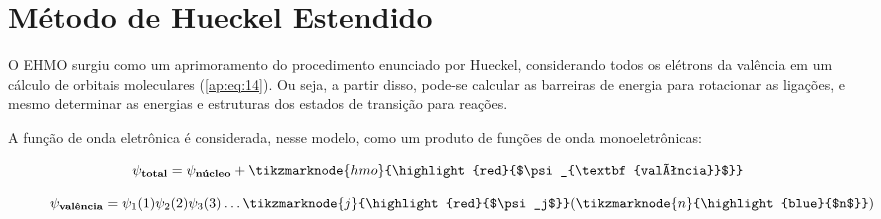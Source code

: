 \chapter{Método de Hueckel Estendido} \label{ap:EHMO}

O \gls{EHMO} surgiu como um aprimoramento do procedimento enunciado por Hueckel, considerando todos os elétrons da valência em um cálculo de orbitais moleculares (\autoref{ap:eq:14}). Ou seja, a partir disso, pode-se calcular as barreiras de energia para rotacionar as ligações, e mesmo determinar as energias e estruturas dos estados de transição para reações.

A função de onda eletrônica é considerada, nesse modelo, como um produto de funções de onda monoeletrônicas:

\begin{figure}[htb]
    \vspace{2\baselineskip}
\begin{equation}
    \label{ap:eq:14}
    \psi_{\textbf{total}} = \psi_{\textbf{núcleo}} + \tikzmarknode{hmo}{\highlight{red}{$\psi_{\textbf{valência}}$}}
\end{equation}
\end{figure}

\begin{figure}[htb]
    \vspace{2\baselineskip}
\begin{equation}
    \psi_{\textbf{valência}} = \psi_1 (1) \psi_2 (2) \psi_3 (3) \dots \tikzmarknode{j}{\highlight{red}{$\psi_j$}} (\tikzmarknode{n}{\highlight{blue}{$n$}})
\end{equation}
\end{figure}

